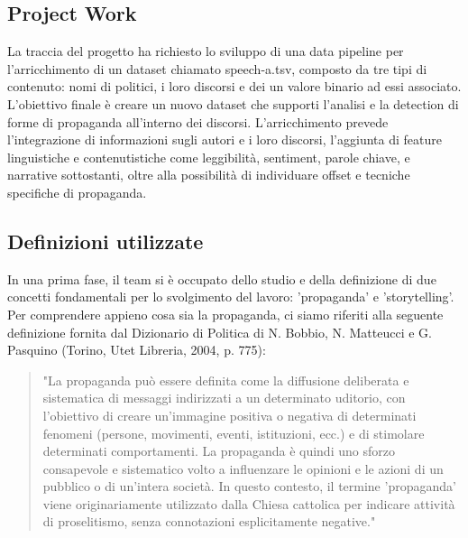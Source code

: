 \documentclass[12pt]{article}
\begin{document}
	\subsection{Project Work}
La traccia del progetto ha richiesto lo sviluppo di una data pipeline per l'arricchimento di un dataset chiamato speech-a.tsv, composto da tre tipi di contenuto: nomi di politici, i loro discorsi e dei un valore binario ad essi associato. L'obiettivo finale è creare un nuovo dataset che supporti l'analisi e la detection di forme di propaganda all'interno dei discorsi. L'arricchimento prevede l'integrazione di informazioni sugli autori e i loro discorsi, l'aggiunta di feature linguistiche e contenutistiche come leggibilità, sentiment, parole chiave, e narrative sottostanti, oltre alla possibilità di individuare offset e tecniche specifiche di propaganda.

	\subsection{Definizioni utilizzate}
In una prima fase, il team si è occupato dello studio e della definizione di due concetti fondamentali per lo svolgimento del lavoro: 'propaganda' e 'storytelling'. Per comprendere appieno cosa sia la propaganda, ci siamo riferiti alla seguente definizione fornita dal Dizionario di Politica di N. Bobbio, N. Matteucci e G. Pasquino (Torino, Utet Libreria, 2004, p. 775):

	\begin{quote}"La propaganda può essere definita come la diffusione deliberata e sistematica di messaggi indirizzati a un determinato uditorio, con l'obiettivo di creare un'immagine positiva o negativa di determinati fenomeni (persone, movimenti, eventi, istituzioni, ecc.) e di stimolare determinati comportamenti. La propaganda è quindi uno sforzo consapevole e sistematico volto a influenzare le opinioni e le azioni di un pubblico o di un'intera società. In questo contesto, il termine 'propaganda' viene originariamente utilizzato dalla Chiesa cattolica per indicare attività di proselitismo, senza connotazioni esplicitamente negative." \end{quote}
	
\newpage
\end{document}
